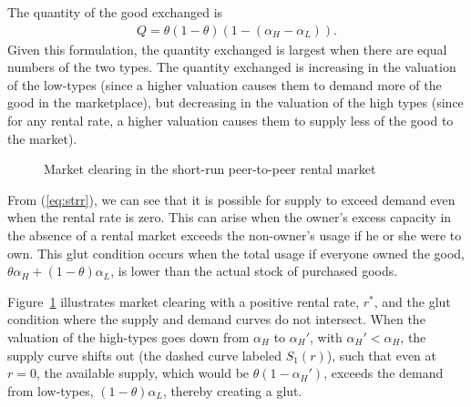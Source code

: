 \documentclass[11pt]{article}
\begin{document}
The quantity of the good exchanged is 
\begin{align} \label{eq:qty}
  Q = \theta (1-\theta) \left(1 - (\alpha_H - \alpha_L)\right).
\end{align} 
Given this formulation, the quantity exchanged is largest when there are equal numbers of the two types.
The quantity exchanged is increasing in the valuation of the low-types (since a higher valuation causes them to demand more of the good in the marketplace), but decreasing in the valuation of the high types (since for any rental rate, a higher valuation causes them to supply less of the good to the market). 
 
\newcommand*{\alphaH}{0.80}%
\newcommand*{\alphaL}{0.50}%
\newcommand*{\alphaHp}{0.40}
\pgfmathsetmacro{\r}{-1 + \alphaH + \alphaL}%
\pgfmathsetmacro{\Q}{\alphaL - \r/2}
\begin{figure} 
\caption{Market clearing in the short-run peer-to-peer rental market} 
\label{fig:market_clearing} 
\begin{center}
\end{center}
\end{figure} 

From (\ref{eq:strr}), we can see that it is possible for supply to exceed demand even when the rental rate is zero. 
This can arise when the owner's excess capacity in the absence of a
rental market exceeds the non-owner's usage if he or she were to own. 
This glut condition occurs when the total usage if everyone owned the good, $\theta \alpha_H + (1-\theta)\alpha_L$, is lower than the actual stock of purchased goods. 

Figure~\ref{fig:market_clearing} illustrates market clearing with a positive rental rate, $r^*$, and the glut condition where the supply and demand curves do not intersect.
When the valuation of the high-types goes down from $\alpha_H$ to $\alpha_H'$, with $\alpha_H' < \alpha_H$, the supply curve shifts out (the dashed curve labeled $S_1(r)$), such that even at $r = 0$, the available supply, which would be $\theta (1-\alpha_H')$, exceeds the demand from low-types, $(1-\theta)\alpha_L$, thereby creating a glut.  
\end{document}
